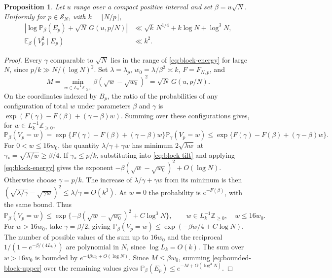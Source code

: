 \documentclass[11pt]{amsart}
\newtheorem{proposition}[theorem]{Proposition}
\theoremstyle{remark}
\newcommand{\Pp}{\mathbb P}
\newcommand{\Ee}{\mathbb E}
\newcommand{\Z}{\mathbb Z}
\begin{document}
\begin{proposition}
\label{prop:block}
Let \(u\) range over a compact positive interval and set \(\beta=u\sqrt N\). Uniformly for \(p\in\mathcal S_N\), with \(k=\lfloor N/p\rfloor\),
\begin{align}
 \left|\log\Pp_\beta(E_p)+\sqrt N\,G(u,p/N)\right|
 &\ll \sqrt{k}\,N^{1/4}+k\log N+\log^3 N,\label{eq:local}\\
 \Ee_\beta(V_p^2\mid E_p)&\ll k^2.\label{eq:block-second}
\end{align}
\end{proposition}

\begin{proof}
Every \(\gamma\) comparable to \(\sqrt N\) lies in the range of \eqref{eq:block-energy} for large \(N\), since \(p/k\gg N/(\log N)^2\). Set \(\lambda=\lambda_p\), \(w_0=\lambda/\beta^2\asymp k\), \(F=F_{N,p}\), and
\[
 M=\min_{w\in L_k^{-1}\Z_{\ge0}}\beta(\sqrt w-\sqrt{w_0})^2
   =\sqrt N\,G(u,p/N).
\]
On the coordinates indexed by \(B_p\), the ratio of the probabilities
of any configuration of total \(w\) under parameters \(\beta\) and \(\gamma\)
is \(\exp(F(\gamma)-F(\beta)+(\gamma-\beta)w)\). Summing over these
configurations gives, for \(w\in L_k^{-1}\Z_{\ge0}\),
\begin{equation}
 \Pp_\beta(V_p=w)
  =\exp\{F(\gamma)-F(\beta)+(\gamma-\beta)w\}\Pp_\gamma(V_p=w)
  \le \exp\{F(\gamma)-F(\beta)+(\gamma-\beta)w\}.
 \label{eq:block-tilt}
\end{equation}
For \(0<w\le16w_0\), the quantity \(\lambda/\gamma+\gamma w\) has minimum \(2\sqrt{\lambda w}\) at \(\gamma_*=\sqrt{\lambda/w}\ge\beta/4\). If \(\gamma_*\le p/k\), substituting into \eqref{eq:block-tilt} and applying \eqref{eq:block-energy} gives the exponent \(-\beta(\sqrt w-\sqrt{w_0})^2+O(\log N)\). Otherwise choose \(\gamma=p/k\). The increase of \(\lambda/\gamma+\gamma w\) from its minimum is then
\((\sqrt{\lambda/\gamma}-\sqrt{\gamma w})^2\le\lambda/\gamma=O(k^3)\).
At \(w=0\) the probability is \(e^{-F(\beta)}\), with the same bound. Thus
\begin{equation}
 \Pp_\beta(V_p=w)\le
 \exp\{-\beta(\sqrt w-\sqrt{w_0})^2+C\log^3 N\},\qquad
 w\in L_k^{-1}\Z_{\ge0},\quad w\le16w_0 .
 \label{eq:bounded-block-upper}
\end{equation}
For \(w>16w_0\), take \(\gamma=\beta/2\), giving \(\Pp_\beta(V_p=w)\le \exp(-\beta w/4+C\log N)\). The number of possible values of the sum up to \(16w_0\) and the reciprocal \(1/(1-e^{-\beta/(4L_k)})\) are polynomial in \(N\), since \(\log L_k=O(k)\). The sum over \(w>16w_0\) is bounded by
\(e^{-4\beta w_0+O(\log N)}\). Since \(M\le\beta w_0\), summing
\eqref{eq:bounded-block-upper} over the remaining values gives
\(\Pp_\beta(E_p)\le e^{-M+O(\log^3N)}\).


\end{proof}
\end{document}
